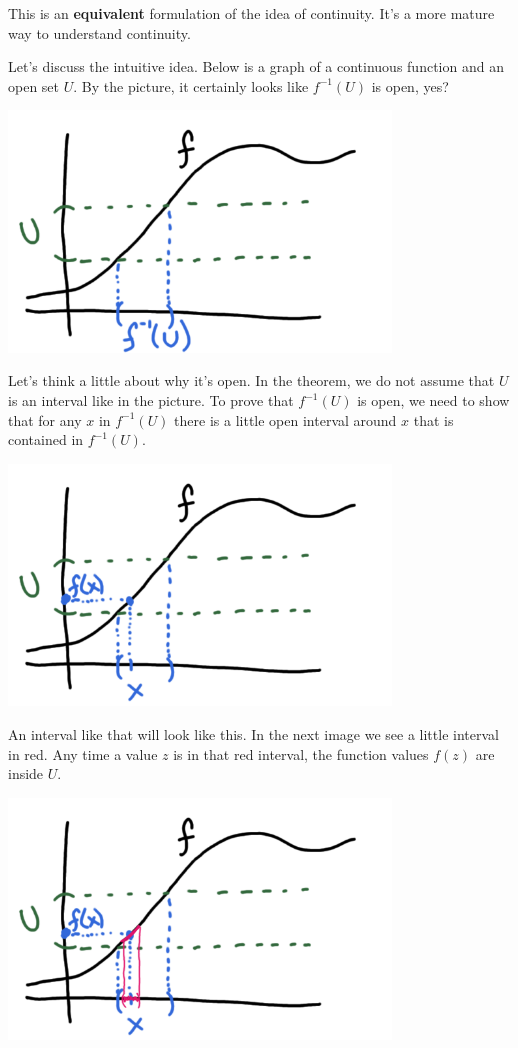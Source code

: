 \documentclass[11pt]{book}
\numberwithin{example}{chapter}
\begin{document}
This is an \textbf{equivalent} formulation of the idea of continuity.  It's a more mature way to understand continuity.  


Let's discuss the intuitive idea.  Below is a graph of a continuous function and an open set $U$.  By the picture, it certainly looks like $f^{-1}(U)$ is open, yes?  

\begin{center}
\includegraphics[width=4in]{toplec1_4.png}
\end{center}

Let's think a little about why it's open.  In the theorem, we do not assume that $U$ is an interval like in the picture.  To prove that $f^{-1}(U)$ is open, we need to show that for any $x$ in $f^{-1}(U)$ there is a little open interval around $x$ that is contained in $f^{-1}(U)$.

\begin{center}
\includegraphics[width=4in]{toplec1_5.png}
\end{center}


An interval like that will look like this.  In the next image we see a little interval in red.  Any time a value $z$ is in that red interval, the function values $f(z)$ are inside $U$.  

\begin{center}
\includegraphics[width=4in]{toplec1_6.png}
\end{center}
\end{document}
